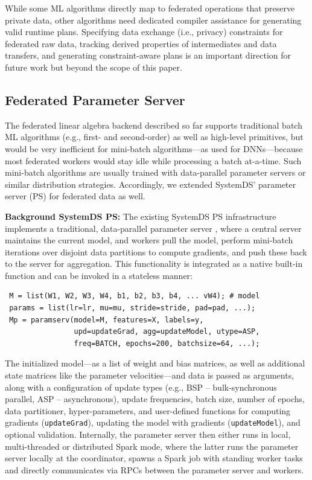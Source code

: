 \documentclass[sigconf,screen]{acmart}
\begin{document}
While some ML algorithms directly map to federated operations that preserve private data, other algorithms need dedicated compiler assistance for generating valid runtime plans. Specifying data exchange (i.e., privacy) constraints for federated raw data, tracking derived properties of intermediates and data transfers, and generating constraint-aware plans is an important direction for future work but beyond the scope of this paper.

\subsection{Federated Parameter Server}
\label{sec:paramserv}

The federated linear algebra backend described so far supports traditional batch ML algorithms (e.g., first- and second-order) as well as high-level primitives, but would be very inefficient for mini-batch algorithms---as used for DNNs---because most federated workers would stay idle while processing a batch at-a-time. Such mini-batch algorithms are usually trained with data-parallel parameter servers or similar distribution strategies. Accordingly, we  extended SystemDS' parameter server (PS) for federated data as well.

\textbf{Background SystemDS PS:} The existing SystemDS PS infrastructure implements a traditional, data-parallel parameter server \cite{SmolaN10,DeanCMCDLMRSTYN12,LiAPSAJLSS14,JiangCZY17}, where a central server maintains the current model, and workers pull the model, perform mini-batch iterations over disjoint data partitions to compute gradients, and push these back to the server for aggregation. This functionality is integrated as a native built-in function and can be invoked in a stateless manner: 

\small \vspace{0.1cm}
\begin{verbatim}
 M = list(W1, W2, W3, W4, b1, b2, b3, b4, ... vW4); # model
 params = list(lr=lr, mu=mu, stride=stride, pad=pad, ...);
 Mp = paramserv(model=M, features=X, labels=y, 
                upd=updateGrad, agg=updateModel, utype=ASP,
                freq=BATCH, epochs=200, batchsize=64, ...);
\end{verbatim}
\normalsize \vspace{0.1cm}

\noindent The initialized model---as a list of weight and bias matrices, as well as additional state matrices like the parameter velocities---and data is passed as arguments, along with a configuration of update types (e.g., BSP -- bulk-synchronous parallel, ASP -- asynchronous), update frequencies, batch size, number of epochs, data partitioner, hyper-parameters, and user-defined functions for computing gradients (\texttt{updateGrad}), updating the model with gradients (\texttt{updateModel}), and optional validation. Internally, the parameter server then either runs in local, multi-threaded or distributed Spark mode, where the latter runs the parameter server locally at the coordinator, spawns a Spark job with standing worker tasks and directly communicates via RPCs between the parameter server and workers.
\end{document}
